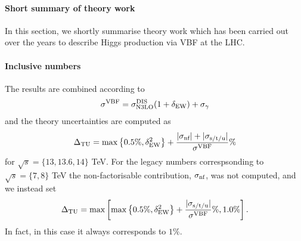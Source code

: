 
\paragraph{Short summary of theory work} In this section, we shortly summarise theory work which has been carried out over the years to describe Higgs production via VBF at the LHC.

\paragraph{Inclusive numbers}

The results are combined according to
\begin{align}
  \label{eq:vbf-xsec-combined}
  \sigma^{\mathrm{VBF}} = \sigma_{\mathrm{N3LO}}^{\mathrm{DIS}} (1+\delta_{\mathrm{EW}}) + \sigma_{\gamma}
\end{align}
and the theory uncertainties are computed as
\begin{align}
  \label{eq:vbf-TU}
  \Delta_{\mathrm{TU}} = \max\left\{0.5\%,\delta_{\mathrm{EW}}^2\right\} + \frac{|\sigma_{\mbox{\scriptsize nf}}| + |\sigma_{\mbox{\scriptsize s/t/u}}|}{\sigma^{\mathrm{VBF}}}\%
\end{align}
for $\sqrt{s}=\{13,13.6,14\}$ TeV. For the legacy numbers correspsonding to $\sqrt{s}=\{7,8\}$ TeV the non-factorisable contribution, $\sigma_{\mbox{\scriptsize nf}}$, was not computed, and we instead set
\begin{align}
  \label{eq:vbf-TU}
  \Delta_{\mathrm{TU}} = \max\left[\max\left\{0.5\%,\delta_{\mathrm{EW}}^2\right\} + \frac{|\sigma_{\mbox{\scriptsize s/t/u}}|}{\sigma^{\mathrm{VBF}}}\%,1.0\%\right].
\end{align}
In fact, in this case it always corresponds to $1\%$.
